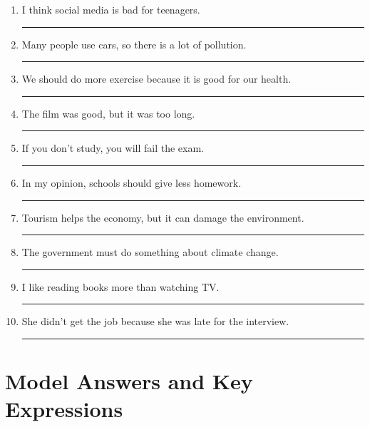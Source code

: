 \begin{enumerate}[leftmargin=2em, label=\arabic*.]
    \item I think social media is bad for teenagers. \\[2ex]
    \rule{\linewidth}{0.4pt}
    

    \item Many people use cars, so there is a lot of pollution. \\[2ex]
    \rule{\linewidth}{0.4pt}
    

    \item We should do more exercise because it is good for our health. \\[2ex]
    \rule{\linewidth}{0.4pt}
    

    \item The film was good, but it was too long. \\[2ex]
    \rule{\linewidth}{0.4pt}
    

    \item If you don’t study, you will fail the exam. \\[2ex]
    \rule{\linewidth}{0.4pt}
    

    \item In my opinion, schools should give less homework. \\[2ex]
    \rule{\linewidth}{0.4pt}
    

    \item Tourism helps the economy, but it can damage the environment. \\[2ex]
    \rule{\linewidth}{0.4pt}
    

    \item The government must do something about climate change. \\[2ex]
    \rule{\linewidth}{0.4pt}
    

    \item I like reading books more than watching TV. \\[2ex]
    \rule{\linewidth}{0.4pt}
    

    \item She didn’t get the job because she was late for the interview. \\[2ex]
    \rule{\linewidth}{0.4pt}
    
\end{enumerate}

\newpage

\section{Model Answers and Key Expressions}


